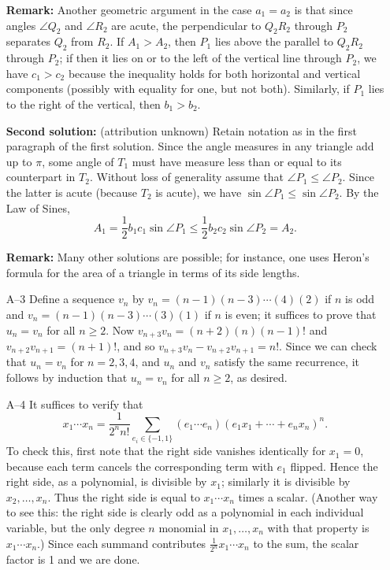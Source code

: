 \documentclass[amssymb,twocolumn,pra,10pt,aps]{revtex4-1}
\begin{document}
\begin{itemize}
\textbf{Remark:}
Another geometric argument in the case $a_1 = a_2$
is that since angles $\angle Q_2$ and $\angle R_2$
are acute, the perpendicular to $Q_2R_2$ through $P_2$ separates $Q_2$ from
$R_2$. If $A_1 > A_2$, then $P_1$ lies above the parallel to $Q_2R_2$
through $P_2$; if then it lies on or to the left of the vertical line
through $P_2$, we have $c_1 > c_2$ because the inequality holds
for both horizontal and vertical components (possibly with equality for one,
but not both). Similarly, if $P_1$ lies to the right of the vertical,
then $b_1 > b_2$.

\textbf{Second solution:} (attribution unknown)
Retain notation as in the first paragraph of the first solution.
Since the angle measures in any triangle add up to $\pi$, some angle
of $T_1$ must have measure less than or equal to its counterpart in
$T_2$. Without loss of generality assume that $\angle P_1 \leq \angle
P_2$. Since the latter is acute (because $T_2$ is acute), we have
$\sin \angle P_1 \leq \sin \angle P_2$. By the Law of Sines,
\[
A_1 = \frac{1}{2} b_1 c_1 \sin \angle P_1 \leq \frac{1}{2}
b_2 c_2 \sin \angle P_2 = A_2.
\]

\textbf{Remark:} Many other solutions are possible; for instance,
one uses Heron's formula for the area of a triangle in terms of
its side lengths.

\item[A--3]
Define a sequence $v_n$ by $v_n = (n-1)(n-3)\cdots(4)(2)$ if $n$ is
odd and $v_n = (n-1)(n-3)\cdots(3)(1)$ if $n$ is even; it suffices to
prove that $u_n = v_n$ for all $n \geq 2$. Now $v_{n+3} v_n =
(n+2)(n)(n-1)!$ and $v_{n+2}v_{n+1} = (n+1)!$, and so $v_{n+3} v_n -
v_{n+2} v_{n+1} = n!$. Since we can check that $u_n = v_n$ for
$n=2,3,4$, and $u_n$ and $v_n$ satisfy the same recurrence, it
follows by induction that $u_n = v_n$ for all $n\geq 2$, as desired.

\item[A--4]
It suffices to verify that
\[
x_1 \cdots x_n = \frac{1}{2^n n!} \sum_{e_i \in \{-1,1\}}
(e_1\cdots e_n) (e_1 x_1 + \cdots + e_n x_n)^n.
\]
To check this, first note that the right side vanishes identically
for $x_1 = 0$, because each term cancels the corresponding term with $e_1$
flipped. Hence the right side, as a polynomial, is divisible by $x_1$;
similarly it is divisible by $x_2, \dots, x_n$. Thus the right side
is equal to $x_1\cdots x_n$ times a scalar. (Another way to see this:
the right side is clearly odd as a polynomial in each individual variable,
but the only degree $n$ monomial in $x_1, \dots, x_n$ with that property
is $x_1 \cdots x_n$.) Since each summand
contributes $\frac{1}{2^n} x_1 \cdots x_n$ to the sum, the scalar factor is
1 and we are done.


\end{itemize}
\end{document}
